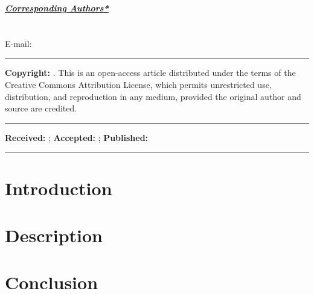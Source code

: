 \documentclass[10pt]{article} %
\begin{document}
\begin{multicols}{2}
\fontsize{9}{10.8}\selectfont\color{Black}

\begin{flushleft}
\color{DarkGreen}\textbf{\underline{\textit{Corresponding Authors*}}} \\
\vspace{0.3cm}
\color{Black}\\
\color{Black}\\
E-mail: \href{mailto:\VAR{email}}{}\\
\vspace{0.1cm}
\rule{\linewidth}{1pt}
\color{DarkGreen}\textbf{Copyright:} 
\color{Black}  . This is an open-access article distributed under the 
terms of the Creative Commons Attribution License, which permits unrestricted 
use, distribution, and reproduction in any medium, provided the original author 
and source are credited.
\vspace{0.1cm}
\rule{\linewidth}{1pt}
\color{Black}\textbf{Received:} ;
\textbf{Accepted:} ; 
\textbf{Published:} 
\rule{\linewidth}{1pt}
\end{flushleft}



\section*{Introduction}
\vspace{-0.5cm}
\begin{otherlanguage}{\VAR{lang_name}}
\end{otherlanguage}


\section*{Description}
\vspace{-0.5cm}
\begin{otherlanguage}{\VAR{lang_name}}
\end{otherlanguage}


\section*{Conclusion}
\vspace{-0.5cm}
\begin{otherlanguage}{\VAR{lang_name}}
\end{otherlanguage}



\end{multicols}
\end{document}
